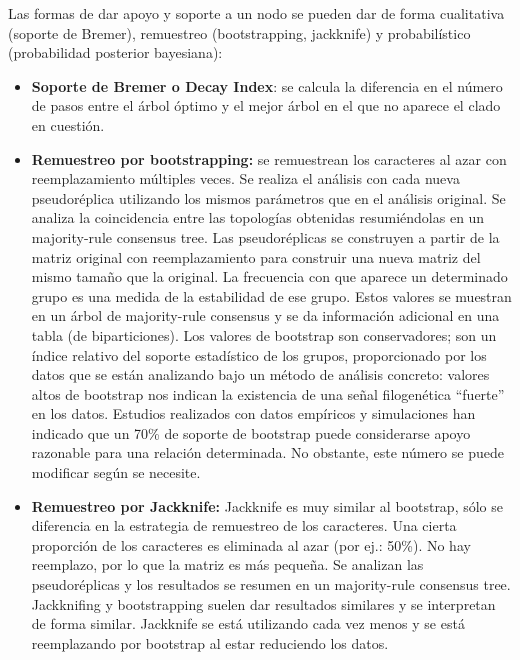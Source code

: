 Las formas de dar apoyo y soporte a un nodo se pueden dar de forma cualitativa (soporte de Bremer), remuestreo (bootstrapping, jackknife) y probabilístico (probabilidad posterior bayesiana): 
\begin{itemize}
\item \textbf{Soporte de Bremer o Decay Index}: se calcula la diferencia en el número de pasos entre el árbol óptimo y el mejor árbol en el que no aparece el clado en cuestión.
\item \textbf{Remuestreo por bootstrapping:} se remuestrean los caracteres al azar con reemplazamiento múltiples veces. Se realiza el análisis con cada nueva pseudoréplica utilizando los mismos parámetros que en el análisis original. Se analiza la coincidencia entre las topologías obtenidas resumiéndolas en un majority-rule consensus tree. Las pseudoréplicas se construyen a partir de la matriz original con reemplazamiento para construir una nueva matriz del mismo tamaño que la original. La frecuencia con que aparece un determinado grupo es una medida de la estabilidad de ese grupo. Estos valores se muestran en un árbol de majority-rule consensus y se da información adicional en una tabla (de biparticiones). Los valores de bootstrap son conservadores; son un índice relativo del soporte estadístico de los grupos, proporcionado por los datos que se están analizando bajo un método de análisis concreto: valores altos de bootstrap nos indican la existencia de una señal filogenética “fuerte” en los datos. Estudios realizados con datos empíricos y simulaciones han indicado que un 70\% de soporte de bootstrap puede considerarse apoyo razonable para una relación determinada. No obstante, este número se puede modificar según se necesite.
\item \textbf{Remuestreo por Jackknife:} Jackknife es muy similar al bootstrap, sólo se diferencia en la estrategia de remuestreo de los caracteres. Una cierta proporción de los caracteres es eliminada al azar (por ej.: 50\%). No hay reemplazo, por lo que la matriz es más pequeña. Se analizan las pseudoréplicas y los resultados se resumen en un majority-rule consensus tree. Jackknifing y bootstrapping suelen dar resultados similares y se interpretan de forma similar. Jackknife se está utilizando cada vez menos y se está reemplazando por bootstrap al estar reduciendo los datos.
\end{itemize}

